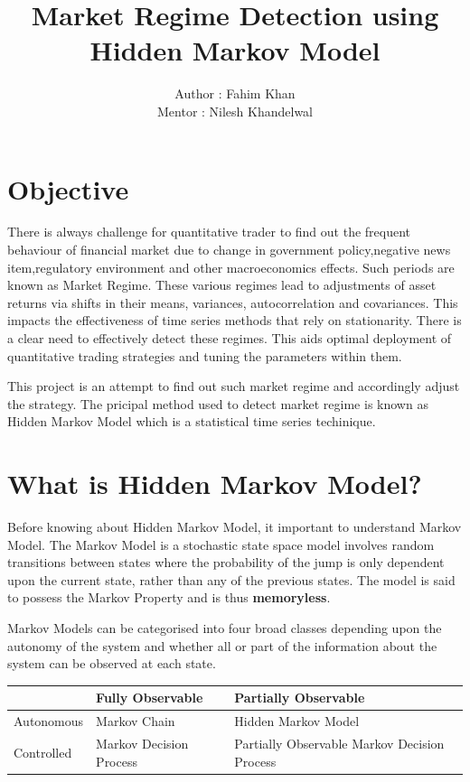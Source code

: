 \documentclass{report}
\author{Author : Fahim Khan \\
		Mentor : Nilesh Khandelwal
}
\title{Market Regime Detection using Hidden Markov Model}
\begin{document}
\maketitle
\tableofcontents



\chapter{Objective}
There is always challenge for quantitative trader to find out the frequent behaviour of financial market due to change in government policy,negative news item,regulatory environment and other macroeconomics effects. Such periods are known as Market Regime.
These various regimes lead to adjustments of asset returns via shifts in their means, variances,
autocorrelation and covariances. This impacts the effectiveness of time series methods that rely
on stationarity.
There is a clear need to effectively detect these regimes. This aids optimal deployment of
quantitative trading strategies and tuning the parameters within them.\par

This project is an attempt to find out such market regime and accordingly adjust the strategy. The pricipal method used to detect market regime is known as Hidden Markov Model which is a statistical time series techinique.


\chapter{What is Hidden Markov Model?}
Before knowing about Hidden Markov Model, it important to understand Markov Model. The Markov Model is a stochastic state space model involves random transitions between states where the probability of the jump is only dependent upon the current state, rather than any of the previous states. The model is said to possess the Markov Property and is thus \textbf{memoryless}.

Markov Models can be categorised into four broad classes depending upon the autonomy
of the system and whether all or part of the information about the system can be observed at
each state.

 
 

\begin{tabu} to 0.8\textwidth { | X[l] | X[c] | X[r] | }
 \hline
  & Fully Observable & Partially Observable \\
 \hline
   Autonomous & Markov Chain  & Hidden Markov Model  \\
\hline
Controlled & Markov Decision Process  & Partially Observable Markov Decision Process \\
\hline
\end{tabu}
\end{document}
